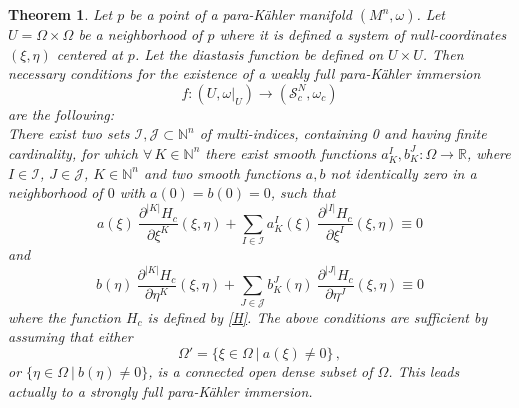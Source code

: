 \documentclass{article}
\newtheorem{thm}{Theorem}
\newcommand{\I}{\mathcal{I}}
\newcommand{\R}{\mathds{R}}
\newcommand{\de}{\partial}
\newcommand{\J}{\mathcal{J}}
\newcommand{\s}{\mathcal{S}}
\newcommand{\pk}{para-K\"ahler }
\newcommand{\N}{\mathds{N}}
\begin{document}
\begin{thm}\label{main}
Let $p$ be a point of a \pk manifold $(M^n,\omega)$. Let $U=\Omega\times\Omega$ be a neighborhood of $p$ where it is defined a system of null-coordinates $(\xi,\eta)$ centered at $p$. Let the diastasis function be defined on $U\times U$.
Then  necessary conditions for the existence of a  weakly  full \pk immersion 
$$f: (U,\omega|_U)\to (\s_c^N,\omega_c)$$
are the following:\\
There exist two sets  $\I,\J\subset \N^n$ of multi-indices, containing 0 and having finite cardinality, for which $\forall\, K\in\N^n$ there exist
smooth functions $a^I_K, b^J_K:\Omega \to\R $, where $I\in\I$, $J\in\J$, $K\in\N^n$ and two  smooth functions 
$a, b$ not identically zero in a neighborhood  of $0$ with $a(0)=b(0)=0$, 
such that
\begin{equation}\label{dip1}
a(\xi)\ \frac{\de^{|K|}H_c}{{\de\xi^{K}}}(\xi,\eta) + \sum_{I\in\I} a^I_K(\xi)\   \frac{\de^{|I|}H_c}{\de\xi^{I}} (\xi,\eta) \equiv 0 
\end{equation}
and
\begin{equation}\label{dip2}
b(\eta)\ \frac{\de^{|K|}H_c}{{\de\eta^{K}}}(\xi,\eta) + \sum_{J\in\J} b^J_K(\eta)\   \frac{\de^{|J|}H_c}{\de\eta^{J}} (\xi,\eta) \equiv 0
\end{equation}
where the function $H_c$ is defined by \eqref{H}.  The above conditions are sufficient by assuming that either \begin{equation}\label{eq:A}
\Omega'=\big\{\xi\in\Omega\ | \ a(\xi)\neq 0\big\}\,,
\end{equation}
or $\big\{\eta\in\Omega\ | \ b(\eta)\neq 0\big\}$,
is a connected  open dense subset of $\Omega$. This leads actually to a strongly full \pk immersion.
\end{thm}
\end{document}
